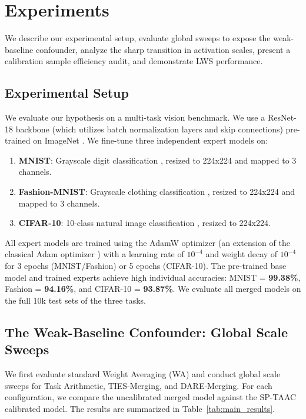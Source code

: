 \documentclass{article}
\theoremstyle{plain}
\theoremstyle{definition}
\theoremstyle{remark}
\begin{document}
\section{Experiments}
\label{sec:experiments}

We describe our experimental setup, evaluate global sweeps to expose the weak-baseline confounder, analyze the sharp transition in activation scales, present a calibration sample efficiency audit, and demonstrate LWS performance.

\subsection{Experimental Setup}
We evaluate our hypothesis on a multi-task vision benchmark. We use a ResNet-18 backbone \cite{resnet} (which utilizes batch normalization layers \cite{batchnorm} and skip connections) pre-trained on ImageNet \cite{imagenet}. We fine-tune three independent expert models on:
\begin{enumerate}
    \item \textbf{MNIST}: Grayscale digit classification \cite{mnist}, resized to 224x224 and mapped to 3 channels.
    \item \textbf{Fashion-MNIST}: Grayscale clothing classification \cite{fashion_mnist}, resized to 224x224 and mapped to 3 channels.
    \item \textbf{CIFAR-10}: 10-class natural image classification \cite{cifar10}, resized to 224x224.
\end{enumerate}
All expert models are trained using the AdamW optimizer \cite{adamw} (an extension of the classical Adam optimizer \cite{adam}) with a learning rate of $10^{-4}$ and weight decay \cite{weight_decay} of $10^{-4}$ for 3 epochs (MNIST/Fashion) or 5 epochs (CIFAR-10). The pre-trained base model and trained experts achieve high individual accuracies: MNIST = \textbf{99.38\%}, Fashion = \textbf{94.16\%}, and CIFAR-10 = \textbf{93.87\%}. We evaluate all merged models on the full 10k test sets of the three tasks.

\subsection{The Weak-Baseline Confounder: Global Scale Sweeps}
We first evaluate standard Weight Averaging (WA) and conduct global scale sweeps for Task Arithmetic, TIES-Merging, and DARE-Merging. For each configuration, we compare the uncalibrated merged model against the SP-TAAC calibrated model. The results are summarized in Table~\ref{tab:main_results}.
\end{document}
